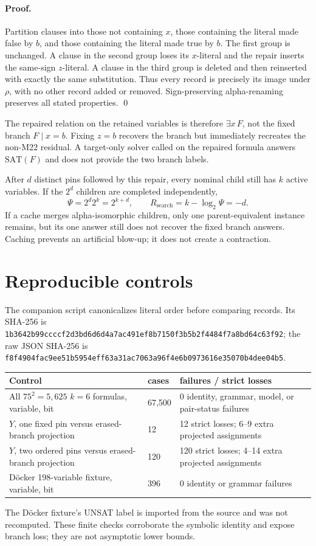 \documentclass[11pt]{article}
\newcommand{\SAT}{\mathrm{SAT}}
\newcommand{\Rsearch}{R_{\mathrm{search}}}
\begin{document}
\paragraph{Proof.}
Partition clauses into those not containing $x$, those containing the literal
made false by $b$, and those containing the literal made true by $b$.
The first group is unchanged.  A clause in the second group loses its
$x$-literal and the repair inserts the same-sign $z$-literal.  A clause in the
third group is deleted and then reinserted with exactly the same substitution.
Thus every record is precisely its image under $\rho$, with no other record
added or removed.  Sign-preserving alpha-renaming preserves all stated
properties. \qed

The repaired relation on the retained variables is therefore
$\exists x\,F$, not the fixed branch $F\mid x=b$.  Fixing $z=b$ recovers the
branch but immediately recreates the non-M22 residual.  A target-only solver
called on the repaired formula answers $\SAT(F)$ and does not provide the two
branch labels.

After $d$ distinct pins followed by this repair, every nominal child still
has $k$ active variables.  If the $2^d$ children are completed independently,
\[
 \Psi=2^d2^k=2^{k+d},\qquad \Rsearch=k-\log_2\Psi=-d.
\]
If a cache merges alpha-isomorphic children, only one parent-equivalent
instance remains, but its one answer still does not recover the fixed branch
answers.  Caching prevents an artificial blow-up; it does not create a
contraction.

\section{Reproducible controls}
The companion script canonicalizes literal order before comparing records.
Its SHA-256 is
\nolinkurl{1b3642b99ccccf2d3bd6d6d4a7ac491ef8b7150f3b5b2f4484f7a8bd64c63f92};
the raw JSON SHA-256 is
\nolinkurl{f8f4904fac9ee51b5954eff63a31ac7063a96f4e6b0973616e35070b4dee04b5}.
\begin{center}
\begin{tabular}{p{.39\linewidth}p{.09\linewidth}p{.40\linewidth}}
\toprule
Control & cases & failures / strict losses\\
\midrule
All $75^2=5{,}625$ $k=6$ formulas, variable, bit & 67,500 & 0 identity, grammar, model, or pair-status failures\\
$Y$, one fixed pin versus erased-branch projection & 12 & 12 strict losses; 6--9 extra projected assignments\\
$Y$, two ordered pins versus erased-branch projection & 120 & 120 strict losses; 4--14 extra projected assignments\\
D\"ocker 198-variable fixture, variable, bit & 396 & 0 identity or grammar failures\\
\bottomrule
\end{tabular}
\end{center}
The D\"ocker fixture's UNSAT label is imported from the source and was not
recomputed.  These finite checks corroborate the symbolic identity and expose
branch loss; they are not asymptotic lower bounds.
\end{document}
